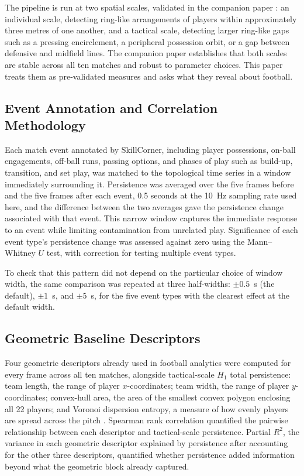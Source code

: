 The pipeline is run at two spatial scales, validated in the companion
paper \cite{paperA}: an individual scale, detecting ring-like
arrangements of players within approximately three metres of one
another, and a tactical scale, detecting larger ring-like gaps such as
a pressing encirclement, a peripheral possession orbit, or a gap
between defensive and midfield lines. The companion paper establishes
that both scales are stable across all ten matches and robust to
parameter choices. This paper treats them as pre-validated measures and
asks what they reveal about football.

\subsection{Event Annotation and Correlation Methodology}

Each match event annotated by SkillCorner, including player possessions, on-ball engagements, off-ball runs, passing options, and phases of play such as build-up, transition, and set play, was matched to the topological
time series in a window immediately surrounding it. Persistence was
averaged over the five frames before and the five frames after each
event, 0.5 seconds at the 10~Hz sampling rate used here, and the
difference between the two averages gave the persistence change
associated with that event. This narrow window captures the immediate
response to an event while limiting contamination from unrelated play. Significance of each
event type's persistence change was assessed against zero using the
Mann--Whitney $U$ test, with correction for testing multiple event
types.

To check that this pattern did not depend on the particular choice of
window width, the same comparison was repeated at three half-widths:
$\pm0.5$~s (the default), $\pm1$~s, and $\pm5$~s, for the five event
types with the clearest effect at the default width.

\subsection{Geometric Baseline Descriptors}

Four geometric descriptors already used in football analytics were
computed for every frame across all ten matches, alongside
tactical-scale $H_1$ total persistence: team length, the range of
player $x$-coordinates; team width, the range of player
$y$-coordinates; convex-hull area, the area of the smallest convex
polygon enclosing all 22 players; and Voronoi dispersion entropy, a
measure of how evenly players are spread across the pitch
\cite{shape_descriptors}. Spearman rank correlation quantified the
pairwise relationship between each descriptor and tactical-scale
persistence. Partial $R^2$, the variance in each geometric descriptor explained by persistence after accounting for the other three descriptors, quantified whether persistence added information beyond
what the geometric block already captured.

